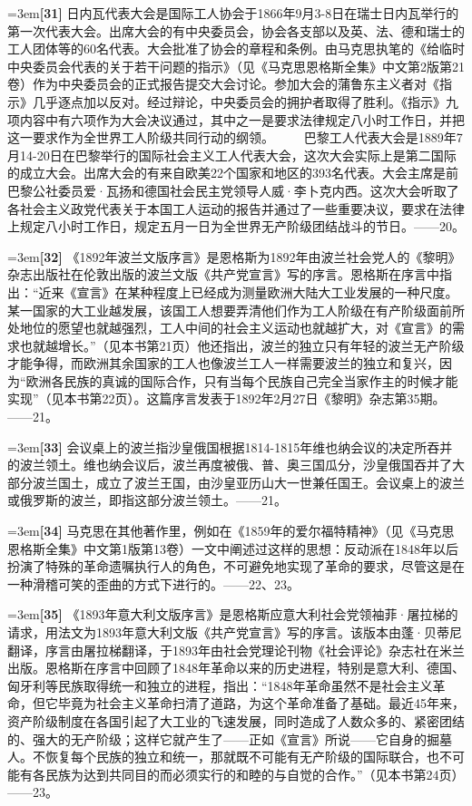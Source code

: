 \documentclass[UTF8,zihao=-4,a4paper]{ctexart}
\begin{document}
\noindent\hangindent=3em\textbf{[31]} 日内瓦代表大会是国际工人协会于1866年9月3-8日在瑞士日内瓦举行的第一次代表大会。出席大会的有中央委员会，协会各支部以及英、法、德和瑞士的工人团体等的60名代表。大会批准了协会的章程和条例。由马克思执笔的《给临时中央委员会代表的关于若干问题的指示》（见《马克思恩格斯全集》中文第2版第21卷）作为中央委员会的正式报告提交大会讨论。参加大会的蒲鲁东主义者对《指示》几乎逐点加以反对。经过辩论，中央委员会的拥护者取得了胜利。《指示》九项内容中有六项作为大会决议通过，其中之一是要求法律规定八小时工作日，并把这一要求作为全世界工人阶级共同行动的纲领。  　　巴黎工人代表大会是1889年7月14-20日在巴黎举行的国际社会主义工人代表大会，这次大会实际上是第二国际的成立大会。出席大会的有来自欧美22个国家和地区的393名代表。大会主席是前巴黎公社委员爱·瓦扬和德国社会民主党领导人威·李卜克内西。这次大会听取了各社会主义政党代表关于本国工人运动的报告并通过了一些重要决议，要求在法律上规定八小时工作日，规定五月一日为全世界无产阶级团结战斗的节日。——20。\par
\noindent\hangindent=3em\textbf{[32]} 《1892年波兰文版序言》是恩格斯为1892年由波兰社会党人的《黎明》杂志出版社在伦敦出版的波兰文版《共产党宣言》写的序言。恩格斯在序言中指出：“近来《宣言》在某种程度上已经成为测量欧洲大陆大工业发展的一种尺度。某一国家的大工业越发展，该国工人想要弄清他们作为工人阶级在有产阶级面前所处地位的愿望也就越强烈，工人中间的社会主义运动也就越扩大，对《宣言》的需求也就越增长。”（见本书第21页）他还指出，波兰的独立只有年轻的波兰无产阶级才能争得，而欧洲其余国家的工人也像波兰工人一样需要波兰的独立和复兴，因为“欧洲各民族的真诚的国际合作，只有当每个民族自己完全当家作主的时候才能实现”（见本书第22页）。这篇序言发表于1892年2月27日《黎明》杂志第35期。——21。\par
\noindent\hangindent=3em\textbf{[33]} 会议桌上的波兰指沙皇俄国根据1814-1815年维也纳会议的决定所吞并的波兰领土。维也纳会议后，波兰再度被俄、普、奥三国瓜分，沙皇俄国吞并了大部分波兰国土，成立了波兰王国，由沙皇亚历山大一世兼任国王。会议桌上的波兰或俄罗斯的波兰，即指这部分波兰领土。——21。\par
\noindent\hangindent=3em\textbf{[34]} 马克思在其他著作里，例如在《1859年的爱尔福特精神》（见《马克思恩格斯全集》中文第1版第13卷）一文中阐述过这样的思想：反动派在1848年以后扮演了特殊的革命遗嘱执行人的角色，不可避免地实现了革命的要求，尽管这是在一种滑稽可笑的歪曲的方式下进行的。——22、23。\par
\noindent\hangindent=3em\textbf{[35]} 《1893年意大利文版序言》是恩格斯应意大利社会党领袖菲·屠拉梯的请求，用法文为1893年意大利文版《共产党宣言》写的序言。该版本由蓬·贝蒂尼翻译，序言由屠拉梯翻译，于1893年由社会党理论刊物《社会评论》杂志社在米兰出版。恩格斯在序言中回顾了1848年革命以来的历史进程，特别是意大利、德国、匈牙利等民族取得统一和独立的进程，指出：“1848年革命虽然不是社会主义革命，但它毕竟为社会主义革命扫清了道路，为这个革命准备了基础。最近45年来，资产阶级制度在各国引起了大工业的飞速发展，同时造成了人数众多的、紧密团结的、强大的无产阶级；这样它就产生了——正如《宣言》所说——它自身的掘墓人。不恢复每个民族的独立和统一，那就既不可能有无产阶级的国际联合，也不可能有各民族为达到共同目的而必须实行的和睦的与自觉的合作。”（见本书第24页）——23。\par
\end{document}
